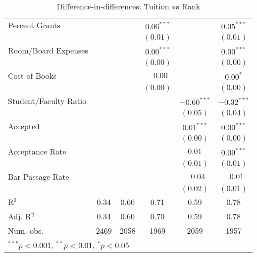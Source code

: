 \begin{table}
\begin{center}
\begin{tabular}{l c c c c c }
Percent Grants        &               &                 & $0.06^{***}$  &               & $0.05^{***}$    \\
                      &               &                 & $(0.01)$      &               & $(0.01)$        \\
Room/Board Expenses   &               &                 & $0.00^{***}$  &               & $0.00^{***}$    \\
                      &               &                 & $(0.00)$      &               & $(0.00)$        \\
Cost of Books         &               &                 & $-0.00$       &               & $0.00^{*}$      \\
                      &               &                 & $(0.00)$      &               & $(0.00)$        \\
Student/Faculty Ratio &               &                 &               & $-0.60^{***}$ & $-0.32^{***}$   \\
                      &               &                 &               & $(0.05)$      & $(0.04)$        \\
Accepted              &               &                 &               & $0.01^{***}$  & $0.00^{***}$    \\
                      &               &                 &               & $(0.00)$      & $(0.00)$        \\
Acceptance Rate       &               &                 &               & $0.01$        & $0.09^{***}$    \\
                      &               &                 &               & $(0.01)$      & $(0.01)$        \\
Bar Passage Rate      &               &                 &               & $-0.03$       & $-0.01$         \\
                      &               &                 &               & $(0.02)$      & $(0.01)$        \\
\hline
R$^2$                 & 0.34          & 0.60            & 0.71          & 0.59          & 0.78            \\
Adj. R$^2$            & 0.34          & 0.60            & 0.70          & 0.59          & 0.78            \\
Num. obs.             & 2469          & 2058            & 1969          & 2059          & 1957            \\
\hline
\multicolumn{6}{l}{\scriptsize{$^{***}p<0.001$, $^{**}p<0.01$, $^*p<0.05$}}
\end{tabular}
\caption{Difference-in-differences: Tuition vs Rank}
\label{tab:tuition-rank}
\end{center}
\end{table}
